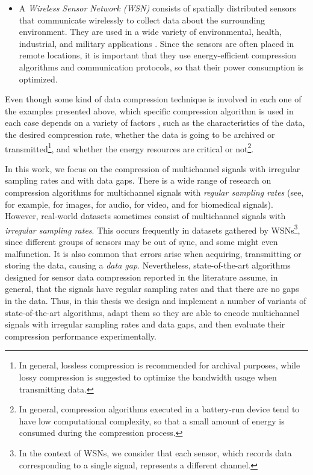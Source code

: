 \begin{itemize}
\item A \textit{Wireless Sensor Network (WSN)} consists of spatially distributed sensors that communicate wirelessly to collect data about the surrounding environment. They are used in a wide variety of environmental, health, industrial, and military applications \cite{WSNWiley, WSNList}. Since the sensors are often placed in remote locations, it is important that they use energy-efficient compression algorithms and communication protocols, so that their power consumption is optimized.
\end{itemize}


\newcommand{\footExampleOne}{\footnote{In general, lossless compression is recommended for archival purposes, while lossy compression is suggested to optimize the bandwidth usage when transmitting data.}}
\newcommand{\footExampleTwo}{\footnote{In general, compression algorithms executed in a battery-run device tend to have low computational complexity, so that a small amount of energy is consumed during the compression process.}}
\newcommand{\footSampling}{\footnote{In the context of WSNs, we consider that each sensor, which records data corresponding to a single signal, represents a different channel.}}


Even though some kind of data compression technique is involved in each one of the examples presented above, which specific compression algorithm is used in each case depends on a variety of factors \cite{DCTSurvey}, such as the characteristics of the data, the desired compression rate, whether the data is going to be archived or transmitted\footExampleOne, and whether the energy resources are critical or not\footExampleTwo.


In this work, we focus on the compression of multichannel signals with irregular sampling rates and with data gaps. There is a wide range of research on compression algorithms for multichannel signals with \textit{regular sampling rates} (see, for example, \cite{ImageOne, ImageTwo} for images, \cite{AudioOne, AudioTwo} for audio, \cite{VideoOne, VideoTwo} for video, and \cite{MedicalOne, MedicalTwo} for biomedical signals). However, real-world datasets sometimes consist of multichannel signals with \textit{irregular sampling rates}. This occurs frequently in datasets gathered by WSNs\footSampling, since different groups of sensors may be out of sync, and some might even malfunction. It is also common that errors arise when acquiring, transmitting or storing the data, causing a \textit{data gap}. Nevertheless, state-of-the-art algorithms designed for sensor data compression reported in the literature \cite{AnEva2013, Signal2016} assume, in general, that the signals have regular sampling rates and that there are no gaps in the data. Thus, in this thesis we design and implement a number of variants of state-of-the-art algorithms, adapt them so they are able to encode multichannel signals with irregular sampling rates and data gaps, and then evaluate their compression performance experimentally.


